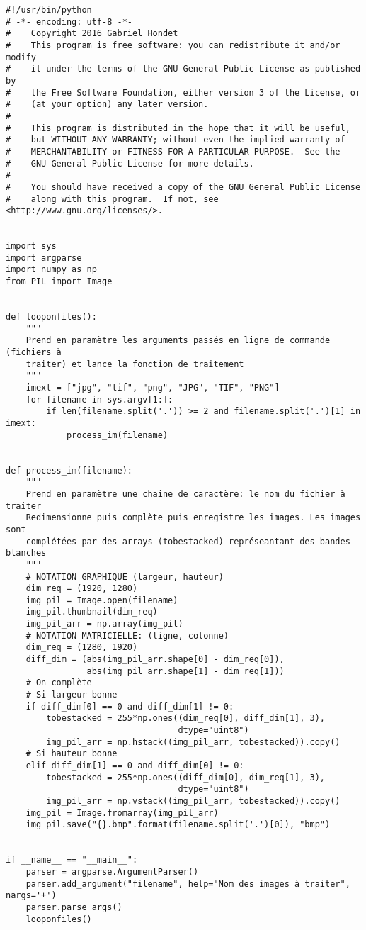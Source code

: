 ﻿\documentclass[12pt]{report}
\begin{document}
\begin{verbatim}
#!/usr/bin/python
# -*- encoding: utf-8 -*-
#    Copyright 2016 Gabriel Hondet
#    This program is free software: you can redistribute it and/or modify
#    it under the terms of the GNU General Public License as published by
#    the Free Software Foundation, either version 3 of the License, or
#    (at your option) any later version.
#
#    This program is distributed in the hope that it will be useful,
#    but WITHOUT ANY WARRANTY; without even the implied warranty of
#    MERCHANTABILITY or FITNESS FOR A PARTICULAR PURPOSE.  See the
#    GNU General Public License for more details.
#
#    You should have received a copy of the GNU General Public License
#    along with this program.  If not, see <http://www.gnu.org/licenses/>.


import sys
import argparse
import numpy as np
from PIL import Image


def looponfiles():
    """
    Prend en paramètre les arguments passés en ligne de commande (fichiers à
    traiter) et lance la fonction de traitement
    """
    imext = ["jpg", "tif", "png", "JPG", "TIF", "PNG"]
    for filename in sys.argv[1:]:
        if len(filename.split('.')) >= 2 and filename.split('.')[1] in imext:
            process_im(filename)


def process_im(filename):
    """
    Prend en paramètre une chaine de caractère: le nom du fichier à traiter
    Redimensionne puis complète puis enregistre les images. Les images sont
    complétées par des arrays (tobestacked) représeantant des bandes blanches
    """
    # NOTATION GRAPHIQUE (largeur, hauteur)
    dim_req = (1920, 1280)
    img_pil = Image.open(filename)
    img_pil.thumbnail(dim_req)
    img_pil_arr = np.array(img_pil)
    # NOTATION MATRICIELLE: (ligne, colonne)
    dim_req = (1280, 1920)
    diff_dim = (abs(img_pil_arr.shape[0] - dim_req[0]),
                abs(img_pil_arr.shape[1] - dim_req[1]))
    # On complète
    # Si largeur bonne
    if diff_dim[0] == 0 and diff_dim[1] != 0:
        tobestacked = 255*np.ones((dim_req[0], diff_dim[1], 3),
                                  dtype="uint8")
        img_pil_arr = np.hstack((img_pil_arr, tobestacked)).copy()
    # Si hauteur bonne
    elif diff_dim[1] == 0 and diff_dim[0] != 0:
        tobestacked = 255*np.ones((diff_dim[0], dim_req[1], 3),
                                  dtype="uint8")
        img_pil_arr = np.vstack((img_pil_arr, tobestacked)).copy()
    img_pil = Image.fromarray(img_pil_arr)
    img_pil.save("{}.bmp".format(filename.split('.')[0]), "bmp")


if __name__ == "__main__":
    parser = argparse.ArgumentParser()
    parser.add_argument("filename", help="Nom des images à traiter", nargs='+')
    parser.parse_args()
    looponfiles()
\end{verbatim}
\end{document}
